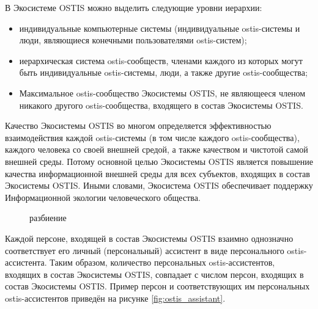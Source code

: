 В Экосистеме OSTIS можно выделить следующие уровни иерархии:
\begin{itemize}
    \item индивидуальные компьютерные системы (индивидуальные ostis-системы и люди, являющиеся конечными пользователями ostis-систем);
    \item иерархическая система ostis-сообществ, членами каждого из которых могут быть индивидуальные ostis-системы, люди, а также другие ostis-сообщества;
    \item Максимальное ostis-сообщество Экосистемы OSTIS, не являющееся членом никакого другого ostis-сообщества, входящего в состав Экосистемы OSTIS.
\end{itemize}

Качество Экосистемы OSTIS во многом определяется эффективностью взаимодействия каждой ostis-системы (в том числе каждого ostis-сообщества), каждого человека со своей внешней средой, а также качеством и чистотой самой внешней среды. 
Потому основной целью Экосистемы OSTIS является повышение качества информационной внешней среды для всех субъектов, входящих в состав Экосистемы OSTIS.
Иными словами, Экосистема OSTIS обеспечивает поддержку Информационной экологии человеческого общества.

\begin{figure}[htbp]
\begin{SCn}
\begin{scnrelfromset}{разбиение}
\end{scnrelfromset}
\end{SCn}
\end{figure}

Каждой персоне, входящей в состав Экосистемы OSTIS взаимно однозначно соответствует его личный (персональный) ассистент в виде персонального ostis-ассистента. 
Таким образом, количество персональных ostis-ассистентов, входящих в состав Экосистемы OSTIS, совпадает с числом персон, входящих в состав Экосистемы OSTIS.
Пример персон и соответствующих им персональных ostis-ассистентов приведён на рисунке \ref{fig:ostis_assistant}.


